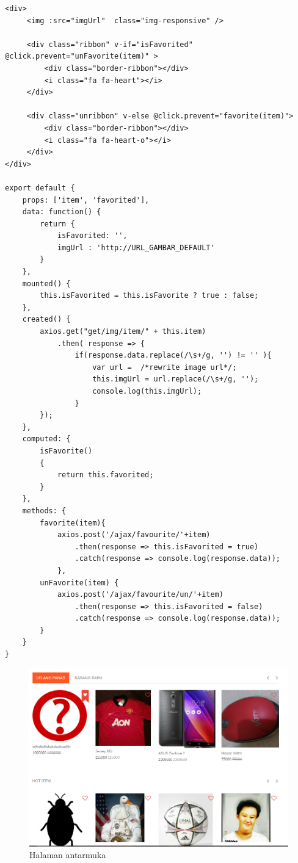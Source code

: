 \begin{lstlisting}[label=cdv.02-01,style=htmlcssjs,caption=Kode Sumber Vue Melihat Daftar Barang]
<div>
	 <img :src="imgUrl"  class="img-responsive" />
	 
	 <div class="ribbon" v-if="isFavorited" @click.prevent="unFavorite(item)" >
		 <div class="border-ribbon"></div>
		 <i class="fa fa-heart"></i>
	 </div>
	 
	 <div class="unribbon" v-else @click.prevent="favorite(item)">
		 <div class="border-ribbon"></div>
		 <i class="fa fa-heart-o"></i>
	 </div>
</div>

export default {
    props: ['item', 'favorited'],
    data: function() {
        return {
            isFavorited: '',
            imgUrl : 'http://URL_GAMBAR_DEFAULT'
        }
    },
    mounted() {
        this.isFavorited = this.isFavorite ? true : false;
    },
    created() {
        axios.get("get/img/item/" + this.item)
            .then( response => {
	            if(response.data.replace(/\s+/g, '') != '' ){
	            	var url =  /*rewrite image url*/;
	            	this.imgUrl = url.replace(/\s+/g, '');
	            	console.log(this.imgUrl);
	        	}
    	});
    },
    computed: {
        isFavorite()
        {
            return this.favorited;
        }
    },
    methods: {
        favorite(item){
            axios.post('/ajax/favourite/'+item)
                .then(response => this.isFavorited = true)
        		.catch(response => console.log(response.data));
        	},
        unFavorite(item) {
            axios.post('/ajax/favourite/un/'+item)
                .then(response => this.isFavorited = false)
        		.catch(response => console.log(response.data));
        }
    }
}
\end{lstlisting}

\begin{figure}[H]
	\centering
	\includegraphics[width=\textwidth]{images/bab4/ui/02-01.png}
	\caption{Halaman antarmuka }
	\label{ui.02-01}
\end{figure}

